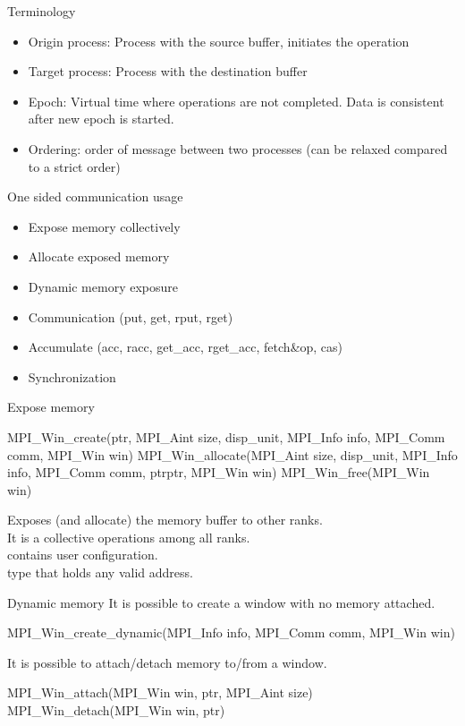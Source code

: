 \documentclass[aspectratio=43]{beamer}
\begin{document}
\begin{frame}[fragile]{Terminology}
\begin{itemize}
\item Origin process: Process with the source buffer, initiates the operation
\item Target process: Process with the destination buffer
\item Epoch: Virtual time where operations are not completed. Data is consistent after new epoch is started.
\item Ordering: order of message between two processes (can be relaxed compared to a strict order)
\end{itemize}

\end{frame}

\begin{frame}[fragile]{One sided communication usage}
\begin{itemize}
\item Expose memory collectively
\item Allocate exposed memory
\item Dynamic memory exposure
\item Communication (put, get, rput, rget)
\item Accumulate (acc, racc, get\_acc, rget\_acc, fetch\&op, cas)
\item Synchronization
\end{itemize}
\end{frame}

\begin{frame}[fragile]{Expose memory}

\begin{Pseudolisting}[]{}
MPI_Win_create(ptr, MPI_Aint size, disp_unit, MPI_Info info,
               MPI_Comm comm, MPI_Win win)
MPI_Win_allocate(MPI_Aint size, disp_unit, MPI_Info info,
                 MPI_Comm comm, ptrptr, MPI_Win win)
MPI_Win_free(MPI_Win win)
\end{Pseudolisting}
Exposes (and allocate) the memory buffer to other ranks.\\
It is a collective operations among all ranks.\\

 contains user configuration.\\
 type that holds any valid address.
\end{frame}

\begin{frame}[fragile]{Dynamic memory}
It is possible to create a window with no memory attached.

\begin{Pseudolisting}[]{}
MPI_Win_create_dynamic(MPI_Info info, MPI_Comm comm,
                       MPI_Win win)
\end{Pseudolisting}

It is possible to attach/detach memory to/from a window.
\begin{Pseudolisting}[]{}
MPI_Win_attach(MPI_Win win, ptr, MPI_Aint size)
MPI_Win_detach(MPI_Win win, ptr)
\end{Pseudolisting}
\end{frame}
\end{document}
